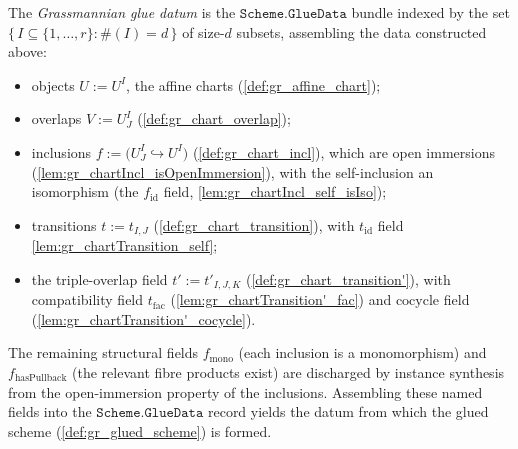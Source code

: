 \begin{definition}

  \label{def:gr_the_glue_data}
  The \emph{Grassmannian glue datum} is the \(\mathtt{Scheme.GlueData}\) bundle
  indexed by the set \(\{\, I \subseteq \{1,\dots,r\} : \#(I) = d \,\}\) of
  size-\(d\) subsets, assembling the data constructed above:
  \begin{itemize}
    \item objects \(U := U^I\), the affine charts (\cref{def:gr_affine_chart});
    \item overlaps \(V := U^I_J\) (\cref{def:gr_chart_overlap});
    \item inclusions \(f := \bigl(U^I_J \hookrightarrow U^I\bigr)\)
      (\cref{def:gr_chart_incl}), which are open immersions
      (\cref{lem:gr_chartIncl_isOpenImmersion}), with the self-inclusion an
      isomorphism (the \(f_{\mathrm{id}}\) field,
      \cref{lem:gr_chartIncl_self_isIso});
    \item transitions \(t := t_{I,J}\) (\cref{def:gr_chart_transition}), with
      \(t_{\mathrm{id}}\) field \cref{lem:gr_chartTransition_self};
    \item the triple-overlap field \(t' := t'_{I,J,K}\)
      (\cref{def:gr_chart_transition'}), with compatibility field
      \(t_{\mathrm{fac}}\) (\cref{lem:gr_chartTransition'_fac}) and \(\mathrm{cocycle}\)
      field (\cref{lem:gr_chartTransition'_cocycle}).
  \end{itemize}
  The remaining structural fields \(f_{\mathrm{mono}}\) (each inclusion is a
  monomorphism) and \(f_{\mathrm{hasPullback}}\) (the relevant fibre products
  exist) are discharged by instance synthesis from the open-immersion property of
  the inclusions. Assembling these named fields into the
  \(\mathtt{Scheme.GlueData}\) record yields the datum from which the glued scheme
  (\cref{def:gr_glued_scheme}) is formed.
\end{definition}

